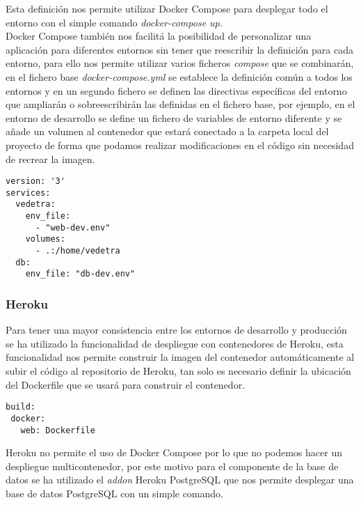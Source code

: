 \documentclass[../proyecto.tex]{subfiles}
\begin{document}
Esta definición nos permite utilizar Docker Compose para desplegar todo el entorno con el simple comando \textit{docker-compose up}.\\

Docker Compose también nos facilitá la posibilidad de personalizar una aplicación para  diferentes entornos sin tener que reescribir la definición para cada entorno, para ello nos permite utilizar varios ficheros \textit{compose} que se combinarán, en el fichero base \textit{docker-compose.yml} se establece la definición común a todos los entornos y en un segundo fichero se definen las directivas específicas del entorno que ampliarán o sobreescribirán las definidas en el fichero base, por ejemplo, en el entorno de desarrollo se define un fichero de variables de entorno diferente y se añade un volumen al contenedor que estará conectado a la carpeta local del proyecto de forma que podamos realizar modificaciones en el código sin necesidad de recrear la imagen.\\

\begin{minipage}{\linewidth}
\begin{lstlisting}[caption=Fichero docker-compose.yml para el entorno de desarrollo, captionpos=b, frame=single]
version: '3'
services:
  vedetra:
    env_file:
      - "web-dev.env"
    volumes:
      - .:/home/vedetra
  db:
    env_file: "db-dev.env"
\end{lstlisting}
\end{minipage}

\subsubsection{Heroku}

Para tener una mayor consistencia entre los entornos de desarrollo y producción se ha utilizado la funcionalidad de despliegue con contenedores de Heroku, esta funcionalidad nos permite construir la imagen del contenedor automáticamente al subir el código al repositorio de Heroku, tan solo es necesario definir la ubicación del Dockerfile que se usará para construir el contenedor.\\

\begin{minipage}{\linewidth}
\begin{lstlisting}[caption=Definición de aplicación de Heroku, captionpos=b, frame=single]
build:
 docker:
   web: Dockerfile
\end{lstlisting}
\end{minipage}

Heroku no permite el uso de Docker Compose por lo que no podemos hacer un despliegue multicontenedor, por este motivo para el componente de la base de datos se ha utilizado el \textit{addon} Heroku PostgreSQL que nos permite desplegar una base de datos PostgreSQL con un simple comando.\\
\end{document}
